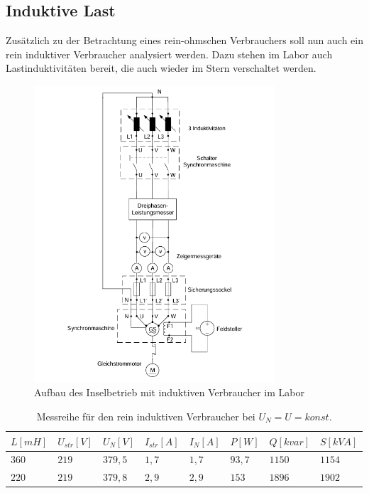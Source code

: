 \documentclass{report}
\begin{document}
\subsection{Induktive Last}
\label{sec:induktive-last}

Zusätzlich zu der Betrachtung eines rein-ohmschen Verbrauchers soll nun auch ein rein induktiver Verbraucher analysiert werden. Dazu stehen im Labor auch Lastinduktivitäten bereit, die auch wieder im Stern verschaltet werden.


\begin{figure}[!ht]
  \centering
  \includegraphics[width=0.8\textwidth]{./assets/img/inselbetrieb_indukaufbau.png}
  \caption{Aufbau des Inselbetrieb mit induktiven Verbraucher im Labor}
  \label{fig:insel_indukaufbau}
\end{figure}

\begin{table}[!ht]
	\centering
	\begin{tabular}{llllllll}
		\hline
		$L [mH]$ & $U_{str} [V]$ & $U_{N} [V]$ & $I_{str} [A]$ & $I_{N} [A]$ & $P [W]$ & $Q [kvar]$ & $S [kVA]$ \\ \hline
		$360$    & $219$         & $379,5$     & $1,7$         & $1,7$       & $93,7$  & $1150$     & $1154$    \\
		$220$    & $219$         & $379,8$     & $2,9$         & $2,9$       & $153$   & $1896$     & $1902$    \\ \hline
	\end{tabular}
	\label{tab:induk_messreihe_1}
	\caption{Messreihe für den rein induktiven Verbraucher bei $U_{N} = U = konst.$}
\end{table}
\end{document}
